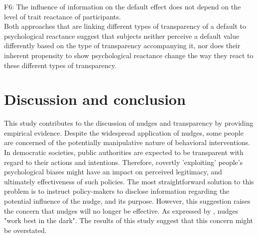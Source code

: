 \documentclass[review, authoryear,12pt]{elsarticle}
\begin{document}
F6: The influence of information on the default effect does not depend on the level of trait reactance of participants. \\

Both approaches that are linking different types of transparency of a default to psychological reactance suggest that subjects neither perceive a default value differently based on the type of transparency accompanying it, nor does their inherent propensity to show psychological reactance change the way they react to these different types of transparency.

\section{Discussion and conclusion}
This study contributes to the discussion of nudges and transparency by providing empirical evidence. Despite the widespread application of nudges, some people are concerned of the potentially manipulative nature of behavioral interventions. In democratic societies, public authorities are expected to be transparent with regard to their actions and intentions. Therefore, covertly 'exploiting' people's psychological biases might have an impact on perceived legitimacy, and ultimately effectiveness of such policies. The most straightforward solution to this problem is to instruct policy-makers to disclose information regarding the potential influence of the nudge, and its purpose. However, this suggestion raises the concern that nudges will no longer be effective. As expressed by \cite{Bovens.2009}, nudges "work best in the dark". The results of this study suggest that this concern might be overstated. 
\end{document}

